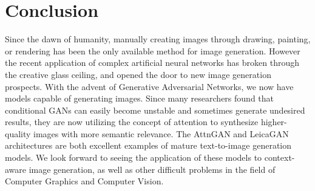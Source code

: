 \documentclass[letterpaper]{article} %
\begin{document}
%



\section{Conclusion}
\label{sec:conclusion}
Since the dawn of humanity, manually creating images through drawing, 
painting, or rendering has been the only available method for image generation. 
However the recent application of complex artificial neural networks
has broken through the creative glass ceiling, and opened the door to new image 
generation prospects. With the advent of Generative Adversarial Networks, we 
now have models capable of generating images. Since many researchers found that 
conditional GANs can easily become unstable and sometimes generate 
undesired results, they are now utilizing the concept of 
attention to synthesize higher-quality images with more semantic relevance. 
The AttnGAN and LeicaGAN architectures are both excellent examples of mature 
text-to-image generation models. We look forward to seeing the application of 
these models to context-aware image generation, as well as other difficult 
problems in the field of Computer Graphics and Computer Vision.
\end{document}
